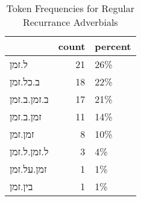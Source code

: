 \begin{table}[htbp!]
\centering
\caption{Token Frequencies for Regular Recurrance Adverbials}
\label{table:regtk_cp}
\begin{tabular}{lrl}
\toprule
{} &  count & percent \\
\midrule
ל.זמן       &     21 &     26\% \\
ב.כל.זמן    &     18 &     22\% \\
ב.זמן.ב.זמן &     17 &     21\% \\
זמן.ב.זמן   &     11 &     14\% \\
זמן.זמן     &      8 &     10\% \\
ל.זמן.ל.זמן &      3 &      4\% \\
זמן.על.זמן  &      1 &      1\% \\
בין.זמן     &      1 &      1\% \\
\bottomrule
\end{tabular}
\end{table}
